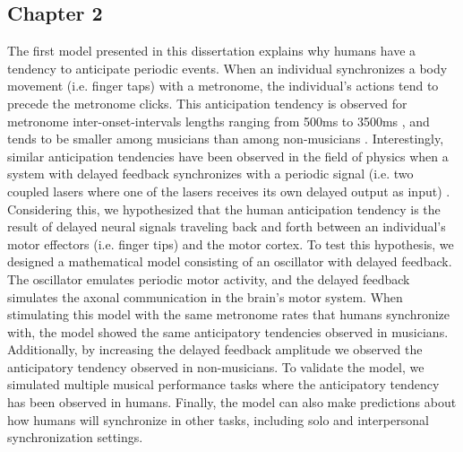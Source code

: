 \documentclass{report}
\begin{document}
\subsection{Chapter 2}
The first model presented in this dissertation explains why humans have a tendency to anticipate periodic events. When an individual synchronizes a body movement (i.e. finger taps) with a metronome, the individual's actions tend to precede the metronome clicks. This anticipation tendency is observed for metronome inter-onset-intervals lengths ranging from 500ms to 3500ms \cite{repp2005sensorimotor}, and tends to be smaller among musicians than among non-musicians \cite{repp2007tapping}. Interestingly, similar anticipation tendencies have been observed in the field of physics when a system with delayed feedback synchronizes with a periodic signal (i.e. two coupled lasers where one of the lasers receives its own delayed output as input) \cite{stepp2010strong}. Considering this, we hypothesized that the human anticipation tendency is the result of delayed neural signals traveling back and forth between an individual's motor effectors (i.e. finger tips) and the motor cortex. To test this hypothesis, we designed a mathematical model consisting of an oscillator with delayed feedback. The oscillator emulates periodic motor activity, and the delayed feedback simulates the axonal communication in the brain's motor system. When stimulating this model with the same metronome rates that humans synchronize with, the model showed the same anticipatory tendencies observed in musicians. Additionally, by increasing the delayed feedback amplitude we observed the anticipatory tendency observed in non-musicians. To validate the model, we simulated multiple musical performance tasks where the anticipatory tendency has been observed in humans. Finally, the model can also make predictions about how humans will synchronize in other tasks, including solo and interpersonal synchronization settings.
\end{document}
